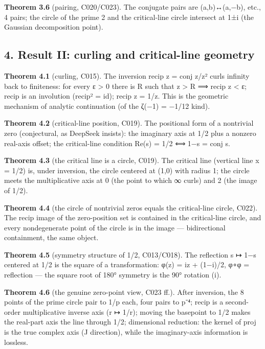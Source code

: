 \documentclass[
]{article}
\begin{document}
\textbf{Theorem 3.6} (pairing, C020/C023). The conjugate pairs are
(a,b)↔(a,−b), etc., 4 pairs; the circle of the prime 2 and the
critical-line circle intersect at 1±i (the Gaussian decomposition
point).

\subsection{4. Result II: curling and critical-line
geometry}\label{result-ii-curling-and-critical-line-geometry}

\textbf{Theorem 4.1} (curling, C015). The inversion recip z = conj
z/\textbar z\textbar² curls infinity back to finiteness: for every ε
\textgreater{} 0 there is R such that \textbar z\textbar{}
\textgreater{} R ⟹ \textbar recip z\textbar{} \textless{} ε; recip is an
involution (recip² = id); \textbar recip z\textbar{} =
1/\textbar z\textbar. This is the geometric mechanism of analytic
continuation (of the ζ(−1) = −1/12 kind).

\textbf{Theorem 4.2} (critical-line position, C019). The positional form
of a nontrivial zero (conjectural, as DeepSeek insists): the imaginary
axis at 1/2 plus a nonzero real-axis offset; the critical-line condition
Re(s) = 1/2 ⟺ 1−s = conj s.

\textbf{Theorem 4.3} (the critical line is a circle, C019). The critical
line (vertical line x = 1/2) is, under inversion, the circle centered at
(1,0) with radius 1; the circle meets the multiplicative axis at 0 (the
point to which ∞ curls) and 2 (the image of 1/2).

\textbf{Theorem 4.4} (the circle of nontrivial zeros equals the
critical-line circle, C022). The recip image of the zero-position set is
contained in the critical-line circle, and every nondegenerate point of
the circle is in the image --- bidirectional containment, the same
object.

\textbf{Theorem 4.5} (symmetry structure of 1/2, C013/C018). The
reflection s ↦ 1−s centered at 1/2 is the square of a transformation:
φ(z) = iz + (1−i)/2, φ∘φ = reflection --- the square root of 180°
symmetry is the 90° rotation (i).

\textbf{Theorem 4.6} (the genuine zero-point view, C023 ff.). After
inversion, the 8 points of the prime circle pair to 1/p each, four pairs
to p⁻⁴; recip is a second-order multiplicative inverse axis (r ↦ 1/r);
moving the basepoint to 1/2 makes the real-part axis the line through
1/2; dimensional reduction: the kernel of proj is the true complex axis
(J direction), while the imaginary-axis information is lossless.
\end{document}
